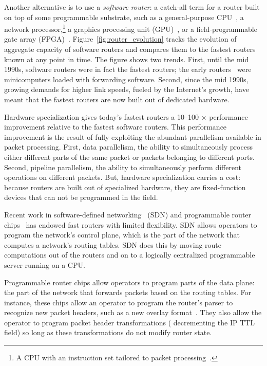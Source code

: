 Another alternative is to use a \textit{software router}: a catch-all term for
a router built on top of some programmable substrate, such as a general-purpose
CPU~\cite{click, routebricks}, a network processor,\footnote{A CPU with an
instruction set tailored to packet processing~\cite{ixp4xx, ixp2800}.} a
graphics processing unit (GPU)~\cite{packetshader}, or a field-programmable
gate array (FPGA)~\cite{netfpga}.  Figure~\ref{fig:router_evolution} tracks the
evolution of aggregate capacity of software routers and compares them to the
fastest routers known at any point in time. The figure shows two trends.
First, until the mid 1990s, software routers were in fact the fastest routers;
the early routers~\cite{imp} were minicomputers loaded with forwarding
software. Second, since the mid 1990s, growing demands for higher link speeds,
fueled by the Internet's growth, have meant that the fastest routers are now
built out of dedicated hardware.

Hardware specialization gives today's fastest routers a 10--100 $\times$ performance
improvement relative to the fastest software routers.  This performance improvement is the
result of fully exploiting the abundant parallelism available in packet
processing. First, data parallelism, the ability to simultaneously process
either different parts of the same packet or packets belonging to different
ports. Second, pipeline parallelism, the ability to simultaneously perform
different operations on different packets. But, hardware specialization carries
a cost: because routers are built out of specialized hardware, they are
fixed-function devices that can not be programmed in the field.

Recent work in software-defined networking~\cite{sdn_history} (SDN) and
programmable router chips~\cite{rmt, xpliant, flexpipe} has endowed fast
routers with limited flexibility. SDN allows operators to program the network's
control plane, which is the part of the network that computes a network's
routing tables. SDN does this by moving route computations out of the routers
and on to a logically centralized programmable server running on a CPU.

Programmable router chips allow operators to program parts of the data plane:
the part of the network that forwards packets based on the routing tables. For
instance, these chips allow an operator to program the router's parser to
recognize new packet headers, such as a new overlay format~\cite{nvgre}.
They also allow the operator to program packet header transformations (\eg
decrementing the IP TTL field) so long as these transformations do not modify
router state.

